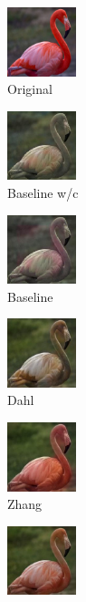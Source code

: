 \begin{figure}[t]
	\begin{subfigure}[b]{0.1\textwidth}
		\centering
		\includegraphics[width=2cm]{or - flamingo.jpg}
		\caption{Original}
	\end{subfigure}
	\hfill
	\begin{subfigure}[b]{0.1\textwidth}
		\includegraphics[width=2cm]{bw - flamingo.jpg}
		\caption{Baseline w/c}
	\end{subfigure}
	\hfill
	\begin{subfigure}[b]{0.1\textwidth}
		\includegraphics[width=2cm]{b - flamingo.jpg}
		\caption{Baseline}
	\end{subfigure}
	\hfill
	\begin{subfigure}[b]{0.1\textwidth}
		\includegraphics[width=2cm]{d - flamingo.jpg}
		\caption{Dahl}
	\end{subfigure}
	\hfill
	\begin{subfigure}[b]{0.1\textwidth}
		\includegraphics[width=2cm]{z - flamingo.jpg}
		\caption{Zhang}
	\end{subfigure}
	\hfill
	\begin{subfigure}[b]{0.1\textwidth}
		\includegraphics[width=2cm]{si- flamingo.jpg}

\end{subfigure}
\end{figure}

